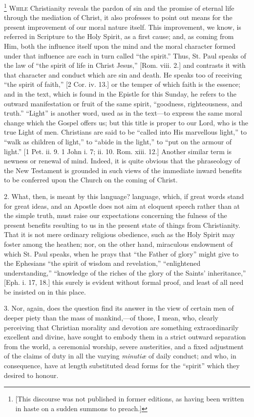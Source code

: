 \footnote{[This discourse was not published in former editions, as having
been written in haste on a sudden summons to preach.]} W\textsc{hile} Christianity
reveals the pardon of sin and the promise of eternal life through the
mediation of Christ, it also professes to point out means for the
present improvement of our moral nature itself. This improvement, we
know, is referred in Scripture to the Holy Spirit, as a first cause;
and, as coming from Him, both the influence itself upon the mind and
the moral character formed under that influence are each in turn
called ``the spirit.'' Thus, St. Paul speaks of the law of
``the spirit of life in Christ Jesus,'' [Rom. viii. 2.] and
contrasts it with that character and conduct which are sin and death.
He speaks too of receiving ``the spirit of faith,'' [2 Cor.
iv. 13.] or the temper of which faith is the essence; and in the text,
which is found in the Epistle for this Sunday, he refers to the
outward manifestation or fruit of the same spirit, ``goodness,
righteousness, and truth.'' ``Light'' is another word,
used as in the text—to express the same moral change which the
Gospel offers us; but this title is proper to our Lord, who is the
true Light of men. Christians are said to be ``called into His
marvellous light,'' to ``walk as children of light,'' to
``abide in the light,'' to ``put on the armour of
light.'' [1 Pet. ii. 9. 1 John i. 7; ii. 10. Rom. xiii. 12.]
Another similar term is newness or renewal of mind. Indeed, it is
quite obvious that the phraseology of the New Testament is grounded in
such views of the immediate inward benefits to be conferred upon the
Church on the coming of Christ.

2. What, then, is meant by this language? language, which, if great
words stand for great ideas, and an Apostle does not aim at eloquent
speech rather than at the simple truth, must raise our expectations
concerning the fulness of the present benefits resulting to us in the
present state of things from Christianity. That it is not mere
ordinary religious obedience, such as the Holy Spirit may foster among
the heathen; nor, on the other hand, miraculous endowment of which St.
Paul speaks, when he prays that ``the Father of glory'' might
give to the Ephesians ``the spirit of wisdom and revelation,''
``enlightened understanding,'' ``knowledge of the riches
of the glory of the Saints' inheritance,'' [Eph. i. 17, 18.] this
surely is evident without formal proof, and least of all need be
insisted on in this place.

3. Nor, again, does the question find its answer in the view of
certain men of deeper piety than the mass of mankind,—of those, I
mean, who, clearly perceiving that Christian morality and devotion are
something extraordinarily excellent and divine, have sought to embody
them in a strict outward separation from the world, a ceremonial
worship, severe austerities, and a fixed adjustment of the claims of
duty in all the varying \emph{minutiæ} of daily conduct; and who, in
consequence, have at length substituted dead forms for the
``spirit'' which they desired to honour.

